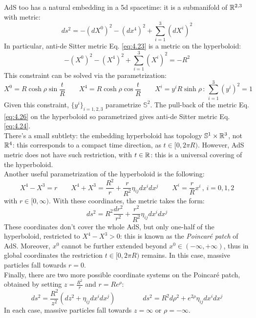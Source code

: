 AdS too has a natural embedding in a 5d spacetime: it is a submanifold of $ \mathbb{R}^{2,3} $ with metric:
\begin{equation}
  ds^2 = - (dX^0)^2 - (dx^4)^2 + \sum_{i = 1}^{3} (dX^i)^2
  \label{eq:4.26}
\end{equation}
In particular, anti-de Sitter metric Eq. \ref{eq:4.23} is a metric on the hyperboloid:
\begin{equation}
  - (X^0)^2 - (X^4)^2 + \sum_{i = 1}^{3} (X^i)^2 = - R^2
  \label{eq:4.27}
\end{equation}
This constraint can be solved via the parametrization:
\begin{equation*}
  X^0 = R \cosh \rho \sin \frac{t}{R}
  \qquad
  X^4 = R \cosh \rho \cos \frac{t}{R}
  \qquad
  X^i = y^i R \sinh \rho
  \,:\,
  \sum_{i = 1}^{3} (y^i)^2 = 1
\end{equation*}
Given this constraint, $ \{y^i\}_{i = 1,2,3} $ parametrize $ \mathbb{S}^2 $. The pull-back of the metric Eq. \ref{eq:4.26} on the hyperboloid so parametrized gives anti-de Sitter metric Eq. \ref{eq:4.24}.\\
There's a small subtlety: the embedding hyperboloid has topology $ \mathbb{S}^1 \times \mathbb{R}^3 $, not $ \mathbb{R}^4 $: this corresponds to a compact time direction, as $ t \in [0, 2\pi R) $. However, AdS metric does not have such restriction, with $ t \in \mathbb{R} $: this is a universal covering of the hyperboloid.\\
Another useful parametrization of the hyperboloid is the following:
\begin{equation*}
  X^4 - X^3 = r
  \qquad
  X^4 + X^3 = \frac{R^2}{r} + \frac{r}{R^2} \eta_{ij} dx^i dx^j
  \qquad
  X^i = \frac{r}{R} x^i
  \,,\, i = 0,1,2
\end{equation*}
with $ r \in [0, \infty) $. With these coordinates, the metric takes the form:
\begin{equation*}
  ds^2 = R^2 \frac{dr^2}{r^2} + \frac{r^2}{R^2} \eta_{ij} dx^i dx^j
\end{equation*}
These coordinates don't cover the whole AdS, but only one-half of the hyperboloid, restricted to $ X^4 - X^3 > 0 $: this is known as the \textit{Poincaré patch} of AdS. Moreover, $ x^0 $ cannot be further extended beyond $ x^0 \in (-\infty, +\infty) $, thus in global coordinates the restriction $ t \in [0,2\pi R) $ remains. In this case, massive particles fall towards $ r = 0 $.\\
Finally, there are two more possible coordinate systems on the Poincaré patch, obtained by setting $ z = \frac{R^2}{r} $ and $ r = R e^\rho $:
\begin{equation*}
  ds^2 = \frac{R^2}{z^2} \left( dz^2 + \eta_{ij} dx^i dx^j \right)
  \qquad \qquad
  ds^2 = R^2 d\rho^2 + e^{2\rho} \eta_{ij} dx^i dx^j
\end{equation*}
In each case, massive particles fall towards $ z = \infty $ or $ \rho = -\infty $.

